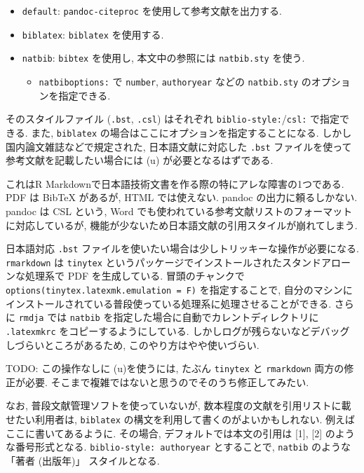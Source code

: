 \documentclass[
  nomag]{bxjsbook}
\providecommand{\tightlist}{%
  \setlength{\itemsep}{0pt}\setlength{\parskip}{0pt}}
\theoremstyle{definition}
\theoremstyle{definition}
\theoremstyle{definition}
\theoremstyle{remark}
\begin{document}
\begin{itemize}
\tightlist
\item
  \texttt{default}: \texttt{pandoc-citeproc}
  を使用して参考文献を出力する.
\item
  \texttt{biblatex}: \texttt{biblatex} を使用する.
\item
  \texttt{natbib}: \texttt{bibtex} を使用し, 本文中の参照には
  \texttt{natbib.sty} を使う.

  \begin{itemize}
  \tightlist
  \item
    \texttt{natbiboptions:} で \texttt{number}, \texttt{authoryear}
    などの \texttt{natbib.sty} のオプションを指定できる.
  \end{itemize}
\end{itemize}

そのスタイルファイル (\texttt{.bst}, \texttt{.csl}) はそれぞれ
\texttt{biblio-style:}/\texttt{csl:} で指定できる. また,
\texttt{biblatex} の場合はここにオプションを指定することになる.
しかし国内論文雑誌などで規定された, 日本語文献に対応した \texttt{.bst}
ファイルを使って参考文献を記載したい場合には (u)\pBibTeX
が必要となるはずである.

これはR Markdownで日本語技術文書を作る際の特にアレな障害の1つである. PDF
は BibTeX があるが, HTML では使えない. pandoc の出力に頼るしかない.
pandoc は CSL という, Word
でも使われている参考文献リストのフォーマットに対応しているが,
機能が少ないため日本語文献の引用スタイルが崩れてしまう.

日本語対応 \texttt{.bst}
ファイルを使いたい場合は少しトリッキーな操作が必要になる.
\texttt{rmarkdown} は \texttt{tinytex}
というパッケージでインストールされたスタンドアローンな処理系で PDF
を生成している. 冒頭のチャンクで
\texttt{options(tinytex.latexmk.emulation\ =\ F)} を指定することで,
自分のマシンにインストールされている普段使っている処理系に処理させることができる.
さらに \texttt{rmdja} では \texttt{natbib}
を指定した場合に自動でカレントディレクトリに \texttt{.latexmkrc}
をコピーするようにしている.
しかしログが残らないなどデバッグしづらいところがあるため,
このやり方はやや使いづらい.

TODO: この操作なしに (u)\pBibTeX を使うには, たぶん \texttt{tinytex} と
\texttt{rmarkdown} 両方の修正が必要.
そこまで複雑ではないと思うのでそのうち修正してみたい.

なお, 普段文献管理ソフトを使っていないが,
数本程度の文献を引用リストに載せたい利用者は, \texttt{biblatex}
の構文を利用して書くのがよいかもしれない. 例えばここに書いてあるように.
その場合, デフォルトでは本文の引用は {[}1{]}, {[}2{]}
のような番号形式となる. \texttt{biblio-style:\ authoryear} とすることで,
\texttt{natbib} のような 「著者 (出版年)」 スタイルとなる.
\end{document}
